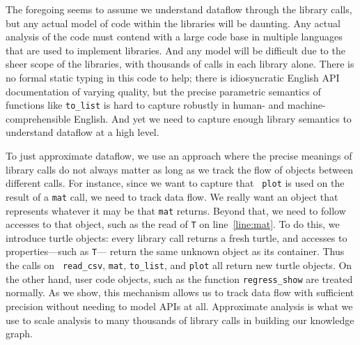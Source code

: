 The foregoing seems to assume we understand dataflow through the library
calls, but any actual model of code within the libraries will be daunting.  Any
actual analysis of the code must contend with a large code base in
multiple languages that are used to implement libraries.  
And any model will be difficult due to the sheer
scope of the libraries, with thousands of calls in each library alone.  There
is no formal static typing in this code to help; there is
idiosyncratic English API documentation of varying quality, but the
precise parametric semantics of functions like {\tt to\_list} is hard
to capture robustly in human- and machine-comprehensible English.  And
yet we need to capture enough library semantics to understand dataflow
at a high level.

To just approximate dataflow, we use an approach where 
the precise meanings of library calls do
not always matter as long as we track the flow of objects between
different calls.  For instance, since we want to capture that {\tt
plot} is used on the result of a {\tt mat} call, we need to track
data flow.  We really want an object that represents whatever it may
be that {\tt mat} returns.  Beyond that, we need to follow accesses to
that object, such as the read of {\tt T} on line~\ref{line:mat}.  To
do this, we introduce turtle objects: every library call returns a fresh
turtle, and accesses to properties---such as {\tt T}--- return the
same unknown object as its container.  Thus the calls on {\tt
  read\_csv}, {\tt mat}, {\tt to\_list}, and {\tt plot} all return new
turtle objects.  On the other hand, user code objects, such as the
function {\tt regress\_show} are treated normally.  As we show, this
mechanism allows us to track data flow with sufficient precision
without needing to model APIs at all.  Approximate analysis is what we use to scale analysis to many thousands of library calls in building our knowledge graph.
